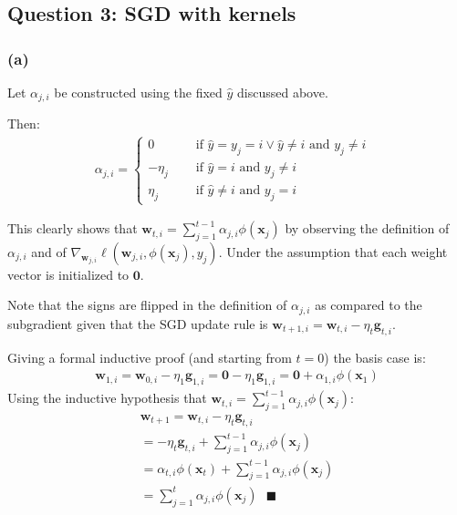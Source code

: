 \documentclass[11pt, oneside]{article}   	%
\begin{document}
\subsection{Question 3: SGD with kernels}
\subsubsection{(a)}
Let $\alpha_{j, i}$ be constructed using the fixed $\hat{y}$ discussed above.

Then:
\begin{gather*}
\alpha_{j, i} =
\begin{cases} 
0 &\quad\text{ if $\hat{y} = y_j = i \lor \hat{y} \neq i$ and $y_j \neq i$ }\\
-\eta_j &\quad\text{ if $\hat{y} = i$ and $y_j \neq i$}\\
\eta_j &\quad\text{ if $\hat{y} \neq i$ and $y_j = i$}
\end{cases}
\end{gather*}

This clearly shows that $\boldsymbol{w}_{t, i} = \sum_{j = 1}^{t-1}\alpha_{j, i}\phi(\boldsymbol{x}_j)$ by observing the definition of $\alpha_{j, i}$ and of $\nabla_{\boldsymbol{w}_{j, i}}\ell(\boldsymbol{w}_{j, i}, \phi(\boldsymbol{x}_j), y_j)$.  Under the assumption that each weight vector is initialized to $\boldsymbol{0}$.

Note that the signs are flipped in the definition of $\alpha_{j, i}$ as compared to the subgradient given that the SGD update rule is $\boldsymbol{w}_{t + 1, i} = \boldsymbol{w}_{t, i} - \eta_t \boldsymbol{g}_{t, i}$.

Giving a formal inductive proof (and starting from $t = 0$) the basis case is:
\begin{gather*}
\boldsymbol{w}_{1, i} = \boldsymbol{w}_{0, i} - \eta_1 \boldsymbol{g}_{1, i} = \boldsymbol{0} - \eta_1 \boldsymbol{g}_{1, i} = \boldsymbol{0} + \alpha_{1, i}\phi(\boldsymbol{x}_1)
\end{gather*}
Using the inductive hypothesis that $\boldsymbol{w}_{t, i} = \sum_{j = 1}^{t-1}\alpha_{j, i}\phi(\boldsymbol{x}_j)$:
\begin{gather*}
\boldsymbol{w}_{t + 1} = \boldsymbol{w}_{t, i} - \eta_{t} \boldsymbol{g}_{t, i} \\
=  - \eta_{t} \boldsymbol{g}_{t, i} + \sum_{j = 1}^{t-1}\alpha_{j, i}\phi(\boldsymbol{x}_j)\\
=  \alpha_{t, i}\phi(\boldsymbol{x}_t) + \sum_{j = 1}^{t-1}\alpha_{j, i}\phi(\boldsymbol{x}_j)\\
=  \sum_{j = 1}^{t}\alpha_{j, i}\phi(\boldsymbol{x}_j) \text{ } \blacksquare
\end{gather*}
\end{document}
